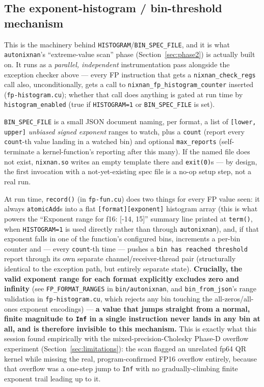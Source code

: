 \documentclass[11pt]{article}
\begin{document}
\subsection{The exponent-histogram / bin-threshold mechanism}
\label{sec:histogram}

This is the machinery behind \texttt{HISTOGRAM}/\texttt{BIN\_SPEC\_FILE},
and it is what \texttt{autonixnan}'s ``extreme-value scan'' phase
(Section~\ref{sec:phase2}) is actually built on. It runs as a
\emph{parallel, independent} instrumentation pass alongside the exception
checker above --- every FP instruction that gets a
\texttt{nixnan\_check\_regs} call also, unconditionally, gets a call to
\texttt{nixnan\_fp\_histogram\_counter} inserted (\texttt{fp-histogram.cu});
whether that call does anything is gated at run time by
\texttt{histogram\_enabled} (true if \texttt{HISTOGRAM=1} or
\texttt{BIN\_SPEC\_FILE} is set).

\texttt{BIN\_SPEC\_FILE} is a small JSON document naming, per format, a
list of \texttt{[lower, upper]} \emph{unbiased signed exponent} ranges to
watch, plus a \texttt{count} (report every \texttt{count}-th value landing
in a watched bin) and optional \texttt{max\_reports} (self-terminate a
kernel-function's reporting after this many). If the named file does not
exist, \texttt{nixnan.so} writes an empty template there and
\texttt{exit(0)}s --- by design, the first invocation with a
not-yet-existing spec file is a no-op setup step, not a real run.

At run time, \texttt{record()} (in \texttt{fp-fun.cu}) does two things
for every FP value seen: it always \texttt{atomicAdd}s into a flat
\texttt{[format][exponent]} histogram array (this is what powers the
``Exponent range for f16: [-14, 15]'' summary line printed at
\texttt{term()}, when \texttt{HISTOGRAM=1} is used directly rather than
through \texttt{autonixnan}), and, if that exponent falls in one of the
function's configured bins, increments a per-bin counter and --- every
\texttt{count}-th time --- pushes a \texttt{bin has reached threshold}
report through its own separate channel/receiver-thread pair
(structurally identical to the exception path, but entirely separate
state). \textbf{Crucially, the valid exponent range for each format
explicitly excludes zero and infinity} (see \texttt{FP\_FORMAT\_RANGES} in
\texttt{bin/autonixnan}, and \texttt{bin\_from\_json}'s range validation in
\texttt{fp-histogram.cu}, which rejects any bin touching the
all-zeros/all-ones exponent encodings) --- \textbf{a value that jumps
straight from a normal, finite magnitude to \texttt{Inf} in a single
instruction never lands in any bin at all, and is therefore invisible to
this mechanism.} This is exactly what this session found empirically
with the mixed-precision-Cholesky Phase-D overflow experiment
(Section~\ref{sec:limitations}): the scan flagged an unrelated fp64 QR
kernel while missing the real, program-confirmed FP16 overflow entirely,
because that overflow was a one-step jump to \texttt{Inf} with no
gradually-climbing finite exponent trail leading up to it.
\end{document}
